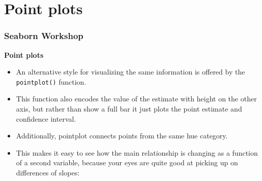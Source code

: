 \documentclass{beamer}
\begin{document}
\section{Point plots}
\begin{frame}[fragile]
	\frametitle{Seaborn Workshop}
	\large
\noindent \textbf{Point plots}
\begin{itemize}
\item An alternative style for visualizing the same information is offered by the \texttt{pointplot()} function. 
\item This function also encodes the value of the estimate with height on the other axis, but rather than show a full bar it just plots the point estimate and confidence interval. 
\item Additionally, pointplot connects points from the same hue category. 
\item This makes it easy to see how the main relationship is changing as a function of a second variable, because your eyes are quite good at picking up on differences of slopes:
\end{itemize}

\end{frame}
\end{document}
